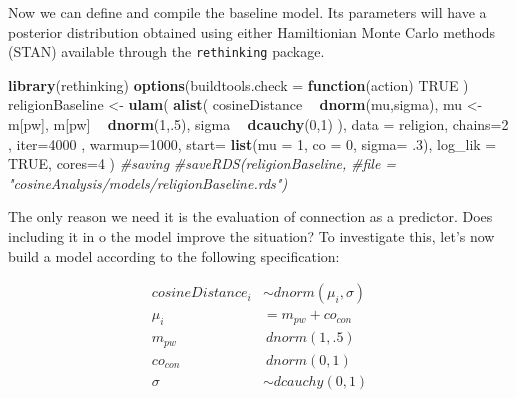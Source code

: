 \documentclass[12pt,]{book}
\newenvironment{Shaded}{\begin{snugshade}}{\end{snugshade}}
\newcommand{\KeywordTok}[1]{\textcolor[rgb]{0.13,0.29,0.53}{\textbf{#1}}}
\newcommand{\DataTypeTok}[1]{\textcolor[rgb]{0.13,0.29,0.53}{#1}}
\newcommand{\DecValTok}[1]{\textcolor[rgb]{0.00,0.00,0.81}{#1}}
\newcommand{\FloatTok}[1]{\textcolor[rgb]{0.00,0.00,0.81}{#1}}
\newcommand{\StringTok}[1]{\textcolor[rgb]{0.31,0.60,0.02}{#1}}
\newcommand{\CommentTok}[1]{\textcolor[rgb]{0.56,0.35,0.01}{\textit{#1}}}
\newcommand{\OtherTok}[1]{\textcolor[rgb]{0.56,0.35,0.01}{#1}}
\newcommand{\ControlFlowTok}[1]{\textcolor[rgb]{0.13,0.29,0.53}{\textbf{#1}}}
\newcommand{\OperatorTok}[1]{\textcolor[rgb]{0.81,0.36,0.00}{\textbf{#1}}}
\newcommand{\NormalTok}[1]{#1}
\begin{document}
Now we can define and compile the baseline model. Its parameters will
have a posterior distribution obtained using either Hamiltionian Monte
Carlo methods (STAN) available through the \texttt{rethinking} package.

\vspace{1mm} \footnotesize

\begin{Shaded}
\begin{Highlighting}[]
\KeywordTok{library}\NormalTok{(rethinking)}
\KeywordTok{options}\NormalTok{(}\DataTypeTok{buildtools.check =} \ControlFlowTok{function}\NormalTok{(action) }\OtherTok{TRUE}\NormalTok{ )}
\NormalTok{religionBaseline <-}\StringTok{ }\KeywordTok{ulam}\NormalTok{(}
  \KeywordTok{alist}\NormalTok{(}
\NormalTok{    cosineDistance }\OperatorTok{~}\StringTok{ }\KeywordTok{dnorm}\NormalTok{(mu,sigma),}
\NormalTok{    mu <-}\StringTok{ }\NormalTok{m[pw],}
\NormalTok{    m[pw] }\OperatorTok{~}\StringTok{ }\KeywordTok{dnorm}\NormalTok{(}\DecValTok{1}\NormalTok{,.}\DecValTok{5}\NormalTok{),}
\NormalTok{    sigma }\OperatorTok{~}\StringTok{ }\KeywordTok{dcauchy}\NormalTok{(}\DecValTok{0}\NormalTok{,}\DecValTok{1}\NormalTok{)}
\NormalTok{  ),}
  \DataTypeTok{data =}\NormalTok{ religion,}
  \DataTypeTok{chains=}\DecValTok{2}\NormalTok{ , }\DataTypeTok{iter=}\DecValTok{4000}\NormalTok{ , }\DataTypeTok{warmup=}\DecValTok{1000}\NormalTok{,}
  \DataTypeTok{start=} \KeywordTok{list}\NormalTok{(}\DataTypeTok{mu =} \DecValTok{1}\NormalTok{, }\DataTypeTok{co =} \DecValTok{0}\NormalTok{, }\DataTypeTok{sigma=} \FloatTok{.3}\NormalTok{),}
  \DataTypeTok{log_lik =} \OtherTok{TRUE}\NormalTok{, }\DataTypeTok{cores=}\DecValTok{4}
\NormalTok{)}
\CommentTok{#saving}
\CommentTok{#saveRDS(religionBaseline, }
\CommentTok{#file = "cosineAnalysis/models/religionBaseline.rds")}
\end{Highlighting}
\end{Shaded}

The only reason we need it is the evaluation of connection as a
predictor. Does including it in o the model improve the situation? To
investigate this, let's now build a model according to the following
specification:

\begin{align}
cosineDistance_i  & \sim dnorm(\mu_i, \sigma) \\
\mu_i & = m_{pw} + co_{con}\\
m_{pw} & ~ dnorm(1,.5) \\
co_{con} & ~ dnorm(0,1) \\
\sigma &\sim  dcauchy(0,1)
\end{align}
\end{document}
